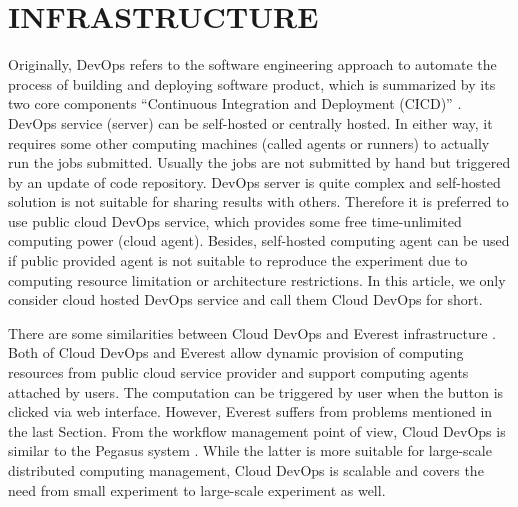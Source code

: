 \documentclass[10pt, conference, compsocconf]{IEEEtran}
\begin{document}
\section{INFRASTRUCTURE}
Originally, DevOps refers to the software engineering approach to automate the process of building and deploying software product, which is summarized by its two core components ``Continuous Integration and Deployment (CICD)'' \cite{bass2015devops}. 
DevOps service (server) can be self-hosted or centrally hosted. In either way, it requires some other computing machines (called agents or runners) to actually run the jobs submitted. Usually the jobs are not submitted by hand but triggered by an update of code repository. 
DevOps server is quite complex and self-hosted solution is not suitable for sharing results with others. Therefore it is preferred to use public cloud DevOps service, which provides some free time-unlimited computing power (cloud agent). Besides, self-hosted computing agent can be used if public provided agent is not suitable to reproduce the experiment due to computing resource limitation or architecture restrictions. In this article, we only consider cloud hosted DevOps service and call them Cloud DevOps for short.

There are some similarities between Cloud DevOps and Everest infrastructure \cite{GavishD12} . Both of Cloud DevOps and Everest allow dynamic provision of computing resources from public cloud service provider and support computing agents attached by users. The computation can be triggered by user when the button is clicked via web interface.
However, Everest suffers from problems mentioned in the last Section. From the workflow management point of view, Cloud DevOps is similar to the Pegasus system \cite{Pegasus}. While the latter is more suitable for large-scale distributed computing management, Cloud DevOps is scalable and covers the need from small experiment to large-scale experiment as well.
\end{document}
